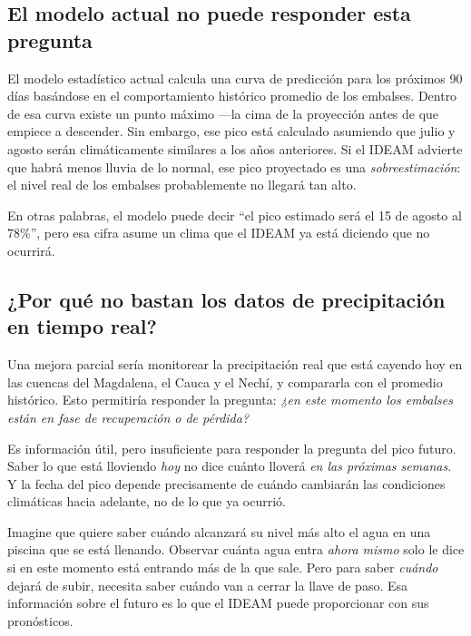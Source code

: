 \documentclass[11pt,a4paper]{article}
\begin{document}
\subsection{El modelo actual no puede responder esta pregunta}

El modelo estadístico actual calcula una curva de predicción para los próximos 90 días basándose en el comportamiento histórico promedio de los embalses. Dentro de esa curva existe un punto máximo —la cima de la proyección antes de que empiece a descender. Sin embargo, ese pico está calculado asumiendo que julio y agosto serán climáticamente similares a los años anteriores. Si el IDEAM advierte que habrá menos lluvia de lo normal, ese pico proyectado es una \textit{sobreestimación}: el nivel real de los embalses probablemente no llegará tan alto.

En otras palabras, el modelo puede decir ``el pico estimado será el 15 de agosto al 78\%'', pero esa cifra asume un clima que el IDEAM ya está diciendo que no ocurrirá.

\subsection{¿Por qué no bastan los datos de precipitación en tiempo real?}

Una mejora parcial sería monitorear la precipitación real que está cayendo hoy en las cuencas del Magdalena, el Cauca y el Nechí, y compararla con el promedio histórico. Esto permitiría responder la pregunta: \textit{¿en este momento los embalses están en fase de recuperación o de pérdida?}

Es información útil, pero insuficiente para responder la pregunta del pico futuro. Saber lo que está lloviendo \textit{hoy} no dice cuánto lloverá \textit{en las próximas semanas}. Y la fecha del pico depende precisamente de cuándo cambiarán las condiciones climáticas hacia adelante, no de lo que ya ocurrió.

\begin{highlightbox}
Imagine que quiere saber cuándo alcanzará su nivel más alto el agua en una piscina que se está llenando. Observar cuánta agua entra \textit{ahora mismo} solo le dice si en este momento está entrando más de la que sale. Pero para saber \textit{cuándo} dejará de subir, necesita saber cuándo van a cerrar la llave de paso. Esa información sobre el futuro es lo que el IDEAM puede proporcionar con sus pronósticos.
\end{highlightbox}
\end{document}
